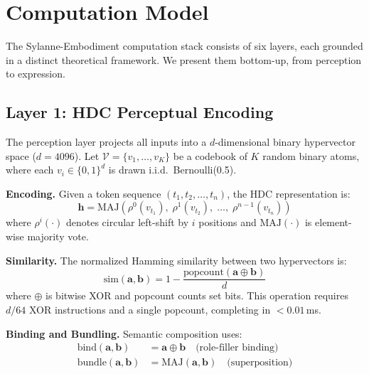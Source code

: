 \documentclass[10pt,twocolumn]{article}
\begin{document}
\section{Computation Model}
\label{sec:computation}

The Sylanne-Embodiment computation stack consists of six layers, each grounded in a distinct theoretical framework. We present them bottom-up, from perception to expression.

\subsection{Layer 1: HDC Perceptual Encoding}

The perception layer projects all inputs into a $d$-dimensional binary hypervector space ($d=4096$). Let $\mathcal{V} = \{v_1, \ldots, v_K\}$ be a codebook of $K$ random binary atoms, where each $v_i \in \{0,1\}^d$ is drawn i.i.d.\ Bernoulli(0.5).

\textbf{Encoding.} Given a token sequence $(t_1, t_2, \ldots, t_n)$, the HDC representation is:
\begin{equation}
\mathbf{h} = \text{MAJ}\left(\rho^0(v_{t_1}),\; \rho^1(v_{t_2}),\; \ldots,\; \rho^{n-1}(v_{t_n})\right)
\label{eq:hdc_encode}
\end{equation}
where $\rho^i(\cdot)$ denotes circular left-shift by $i$ positions and $\text{MAJ}(\cdot)$ is element-wise majority vote.

\textbf{Similarity.} The normalized Hamming similarity between two hypervectors is:
\begin{equation}
\text{sim}(\mathbf{a}, \mathbf{b}) = 1 - \frac{\text{popcount}(\mathbf{a} \oplus \mathbf{b})}{d}
\label{eq:hdc_sim}
\end{equation}
where $\oplus$ is bitwise XOR and popcount counts set bits. This operation requires $d/64$ XOR instructions and a single popcount, completing in $<0.01$\,ms.

\textbf{Binding and Bundling.} Semantic composition uses:
\begin{align}
\text{bind}(\mathbf{a}, \mathbf{b}) &= \mathbf{a} \oplus \mathbf{b} \quad \text{(role-filler binding)} \\
\text{bundle}(\mathbf{a}, \mathbf{b}) &= \text{MAJ}(\mathbf{a}, \mathbf{b}) \quad \text{(superposition)}
\end{align}
\end{document}
